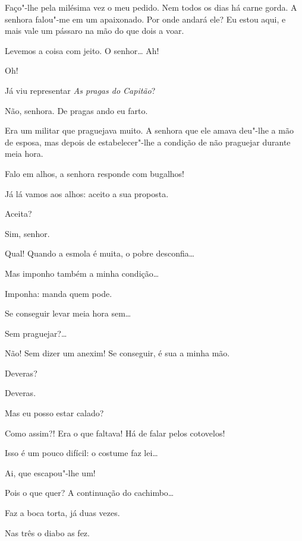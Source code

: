 \begin{linenumbers}
Faço"-lhe pela milésima vez o meu pedido. Nem todos os dias há carne gorda. A
senhora falou"-me em um apaixonado. Por onde andará ele? Eu estou aqui, e mais
vale um pássaro na mão do que dois a voar.

   Levemos a coisa com jeito.   O
senhor\ldots{}  Ah!

  Oh!

  Já viu representar \textit{As pragas do Capitão}?

  Não, senhora. De pragas ando eu farto.

  Era um militar que praguejava muito. A senhora que ele amava deu"-lhe a mão de esposa, mas depois de estabelecer"-lhe a condição de não praguejar
durante meia hora.

  Falo em alhos, a senhora responde com bugalhos!

  Já lá vamos aos alhos: aceito a sua proposta.

   Aceita?

  Sim, senhor.

   Qual! Quando a esmola é muita, o pobre
desconfia\ldots{}

  Mas imponho também a minha condição\ldots{}

  Imponha: manda quem pode.

  Se conseguir levar meia hora sem\ldots{}

  Sem praguejar?\ldots{}

  Não! Sem dizer um anexim! Se conseguir, é sua a minha mão.

  Deveras?

   Deveras.

  Mas eu posso estar calado?

  Como assim?! Era o que faltava! Há de falar pelos cotovelos!

  Isso é um pouco difícil: o costume faz lei\ldots{}

  Ai, que escapou"-lhe um!

  Pois o que quer? A continuação do cachimbo\ldots{}

  Faz a boca torta, já duas vezes.

  Nas três o diabo as fez.


\end{linenumbers}
